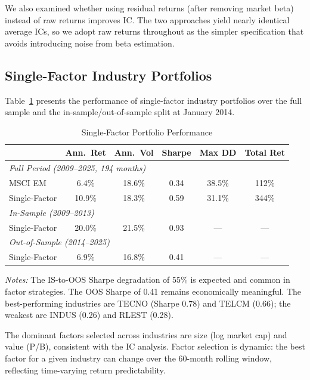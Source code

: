 \documentclass[12pt,a4paper]{article}
\begin{document}
We also examined whether using residual returns (after removing market beta) instead of raw returns improves IC. The two approaches yield nearly identical average ICs, so we adopt raw returns throughout as the simpler specification that avoids introducing noise from beta estimation.

\subsection{Single-Factor Industry Portfolios}

Table~\ref{tab:single_factor} presents the performance of single-factor industry portfolios over the full sample and the in-sample/out-of-sample split at January 2014.

\begin{table}[H]
\centering
\caption{Single-Factor Portfolio Performance}
\label{tab:single_factor}
\small
\begin{tabular}{lccccc}
\toprule
& \textbf{Ann.\ Ret} & \textbf{Ann.\ Vol} & \textbf{Sharpe} & \textbf{Max DD} & \textbf{Total Ret} \\
\midrule
\multicolumn{6}{l}{\textit{Full Period (2009--2025, 194 months)}} \\
MSCI EM         & 6.4\% & 18.6\% & 0.34 & 38.5\% & 112\% \\
Single-Factor   & 10.9\% & 18.3\% & 0.59 & 31.1\% & 344\% \\
\midrule
\multicolumn{6}{l}{\textit{In-Sample (2009--2013)}} \\
Single-Factor   & 20.0\% & 21.5\% & 0.93 & --- & --- \\
\midrule
\multicolumn{6}{l}{\textit{Out-of-Sample (2014--2025)}} \\
Single-Factor   & 6.9\% & 16.8\% & 0.41 & --- & --- \\
\bottomrule
\end{tabular}
\begin{minipage}{\textwidth}
\vspace{0.3em}
\footnotesize
\textit{Notes:} The IS-to-OOS Sharpe degradation of 55\% is expected and common in factor strategies. The OOS Sharpe of 0.41 remains economically meaningful. The best-performing industries are TECNO (Sharpe 0.78) and TELCM (0.66); the weakest are INDUS (0.26) and RLEST (0.28).
\end{minipage}
\end{table}

The dominant factors selected across industries are size (log market cap) and value (P/B), consistent with the IC analysis. Factor selection is dynamic: the best factor for a given industry can change over the 60-month rolling window, reflecting time-varying return predictability.
\end{document}
